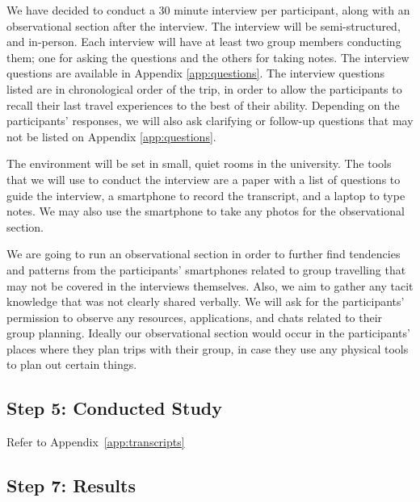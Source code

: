 \documentclass[12pt,a4paper]{article}
\begin{document}
\par
\indent
We have decided to conduct a 30 minute interview per participant, along with an observational
section after the interview. The interview will be semi-structured, and in-person. Each interview will have at least two group members conducting them; one for asking the questions and the others for taking notes. The interview questions are available in Appendix \ref{app:questions}. The interview questions listed are in chronological order of the trip, in order to allow the participants to recall their last travel experiences to the best of their ability. Depending on the participants’ responses, we will also ask clarifying or follow-up questions that may not be listed on Appendix \ref{app:questions}. 
\\

\par
\indent
The environment will be set in small, quiet rooms in the university. The tools that we will use to conduct the interview are a paper with a list of questions to guide the interview,  a smartphone to record the transcript, and a laptop to type notes. We may also use the smartphone to take any photos for the observational section.
\\

\par
\indent
We are going to run an observational section in order to further find tendencies and patterns from the participants’ smartphones related to group travelling that may not be covered in the interviews themselves. Also, we aim to gather any tacit knowledge that was not clearly shared verbally. We will ask for the participants’ permission to observe any resources, applications, and chats related to their group planning. Ideally our observational section would occur in the participants’ places where they plan trips with their group, in case they use any physical tools to plan out certain things.


\subsection{Step 5: Conducted Study}
Refer to Appendix~\ref{app:transcripts}

\subsection{Step 7: Results}
\end{document}
